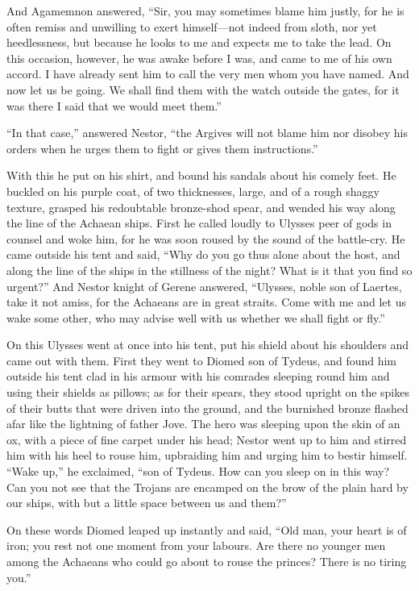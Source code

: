 And Agamemnon answered, “Sir, you may sometimes blame him justly, for he
is often remiss and unwilling to exert himself—not indeed from
sloth, nor yet heedlessness, but because he looks to me and expects me to
take the lead. On this occasion, however, he was awake before I was, and
came to me of his own accord. I have already sent him to call the very men
whom you have named. And now let us be going. We shall find them with the
watch outside the gates, for it was there I said that we would meet them.”

“In that case,” answered Nestor, “the Argives will not blame him nor
disobey his orders when he urges them to fight or gives them
instructions.”

With this he put on his shirt, and bound his sandals about his comely
feet. He buckled on his purple coat, of two thicknesses, large, and of a
rough shaggy texture, grasped his redoubtable bronze-shod spear, and
wended his way along the line of the Achaean ships. First he called loudly
to Ulysses peer of gods in counsel and woke him, for he was soon roused by
the sound of the battle-cry. He came outside his tent and said, “Why do
you go thus alone about the host, and along the line of the ships in the
stillness of the night? What is it that you find so urgent?” And Nestor
knight of Gerene answered, “Ulysses, noble son of Laertes, take it not
amiss, for the Achaeans are in great straits. Come with me and let us wake
some other, who may advise well with us whether we shall fight or fly.”

On this Ulysses went at once into his tent, put his shield about his
shoulders and came out with them. First they went to Diomed son of Tydeus,
and found him outside his tent clad in his armour with his comrades
sleeping round him and using their shields as pillows; as for their
spears, they stood upright on the spikes of their butts that were driven
into the ground, and the burnished bronze flashed afar like the lightning
of father Jove. The hero was sleeping upon the skin of an ox, with a piece
of fine carpet under his head; Nestor went up to him and stirred him with
his heel to rouse him, upbraiding him and urging him to bestir himself.
“Wake up,” he exclaimed, “son of Tydeus. How can you sleep on in this way?
Can you not see that the Trojans are encamped on the brow of the plain
hard by our ships, with but a little space between us and them?”

On these words Diomed leaped up instantly and said, “Old man, your heart
is of iron; you rest not one moment from your labours. Are there no
younger men among the Achaeans who could go about to rouse the princes?
There is no tiring you.”

